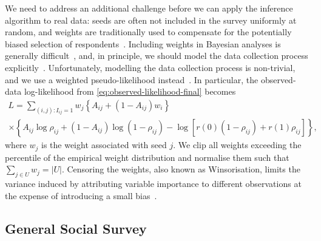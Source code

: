 \documentclass{scrartcl}
\newcommand{\card}[1]{\left|#1\right|}
\newcommand{\seeds}{U}
\begin{document}
We need to address an additional challenge before we can apply the inference algorithm to real data: seeds are often not included in the survey uniformly at random, and weights are traditionally used to compensate for the potentially biased selection of respondents~\cite{Kish1992}. Including weights in Bayesian analyses is generally difficult~\cite{Gelman2007}, and, in principle, we should model the data collection process explicitly~\cite[chapter~8]{Gelman2013}. Unfortunately, modelling the data collection process is non-trivial, and we use a weighted pseudo-likelihood instead~\cite{Pfeffermann1996}. In particular, the observed-data log-likelihood from \cref{eq:observed-likelihood-final} becomes
\begin{multline}
    L = \sum_{(i,j):I_{ij} = 1} w_j\left\{A_{ij} + (1 - A_{ij})w_i\right\}
    \\\times\left\{A_{ij}\log\rho_{ij} + (1-A_{ij})\log(1-\rho_{ij})-\log\left[r(0)(1 - \rho_{ij}) + r(1)\rho_{ij}\right]\right\},\label{eq:survey-weighted-log-likelihood}
\end{multline}
where $w_j$ is the weight associated with seed $j$. We clip all weights exceeding the  percentile of the empirical weight distribution and normalise them such that $\sum_{j\in\seeds}w_j=\card{\seeds}$. Censoring the weights, also known as Winsorisation, limits the variance induced by attributing variable importance to different observations at the expense of introducing a small bias~\cite{Kish1992}.


\subsection{General Social Survey\label{sec:survey-gss}}
\end{document}

